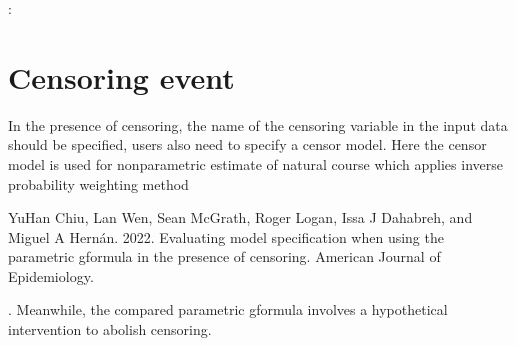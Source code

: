\documentclass[letterpaper,10pt,english]{sphinxmanual}
\begin{document}
\begin{sphinxVerbatim}[commandchars=\\\{\}]
        
      \PYG{p}{[} \PYG{p}{]}
      \PYG{p}{[} \PYG{p}{]}
       
      
\end{sphinxVerbatim}

\sphinxAtStartPar
{}:
\begin{quote}

\end{quote}


\section{Censoring event}
\label{\detokenize{Specifications/Censoring event:censoring-event}}\label{\detokenize{Specifications/Censoring event:id1}}\label{\detokenize{Specifications/Censoring event::doc}}
\sphinxAtStartPar
In the presence of censoring, the name of the censoring variable in the input data should be specified,
users also need to specify a censor model.
Here the censor model is used for nonparametric estimate of natural course which applies inverse probability weighting method \sphinxstepexplicit %
\begin{footnote}[1]\label{\thesphinxscope.1}%
\sphinxAtStartFootnote
Yu\sphinxhyphen{}Han Chiu, Lan Wen, Sean McGrath, Roger Logan, Issa J Dahabreh, and Miguel A Hernán. 2022. Evaluating model specification when using the parametric g\sphinxhyphen{}formula in the presence of censoring. American Journal of Epidemiology.
%
\end{footnote}.
Meanwhile, the compared parametric g\sphinxhyphen{}formula involves a hypothetical intervention to abolish censoring.
\end{document}
